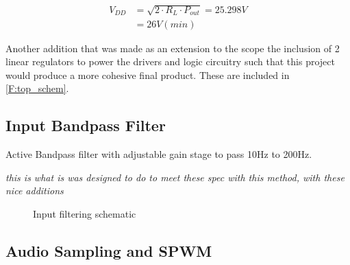\documentclass[11pt]{article}
\begin{document}
{\vspace*{-10mm}
\begin{align*}
  V_{DD} &= \sqrt{2\cdot R_{L}\cdot P_{out}} = 25.298V\\
         &= 26V (min)
\end{align*}

Another addition that was made as an extension to the scope the inclusion of 2 linear regulators to power the drivers and logic circuitry such that this project would produce a more cohesive final product. These are included in \cref{F:top_schem}.


\subsection{Input Bandpass Filter}

Active Bandpass filter with adjustable gain stage to pass 10Hz to 200Hz.

\textit{this is what is was designed to do to meet these spec with this method, with these nice additions}

\begin{figure}[h!]
  \centering
  \caption{Input filtering schematic}
  \label{F:ipf_schem}
\end{figure}

\subsection{Audio Sampling and SPWM}

}
\end{document}

